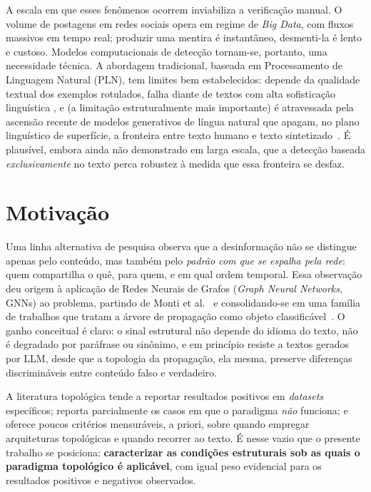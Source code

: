 A escala em que esses fen\^omenos ocorrem inviabiliza a verifica\c{c}\~ao
manual. O volume de postagens em redes sociais opera em regime de
\emph{Big Data}, com fluxos massivos em tempo real; produzir uma mentira
\'e instant\^aneo, desmenti-la \'e lento e custoso. Modelos
computacionais de detec\c{c}\~ao tornam-se, portanto, uma necessidade t\'ecnica. A abordagem tradicional, baseada
em Processamento de Linguagem Natural (PLN), tem limites bem
estabelecidos: depende da qualidade textual dos exemplos rotulados,
falha diante de textos com alta sofistica\c{c}\~ao lingu\'istica
\cite{pmc_overviewfakenews, mdpi_cnn_llm_nlp}, e (a limita\c{c}\~ao
estruturalmente mais importante) \'e atravessada pela ascens\~ao
recente de modelos generativos de l\'ingua natural que apagam, no
plano lingu\'istico de superf\'icie, a fronteira entre texto humano e
texto sintetizado~\cite{arxiv_llmfakenews}. \'E plaus\'ivel, embora
ainda n\~ao demonstrado em larga escala, que a detec\c{c}\~ao baseada
\emph{exclusivamente} no texto perca robustez \`a medida que essa
fronteira se desfaz.

\section{Motiva\c{c}\~ao}
\label{sec:motivacao}

Uma linha alternativa de pesquisa observa que a desinforma\c{c}\~ao
n\~ao se distingue apenas pelo conte\'udo, mas tamb\'em pelo
\emph{padr\~ao com que se espalha pela rede}: quem compartilha o qu\^e,
para quem, e em qual ordem temporal. Essa observa\c{c}\~ao deu origem
\`a aplica\c{c}\~ao de Redes Neurais de Grafos (\emph{Graph Neural
Networks}, GNNs) ao problema, partindo de Monti et
al.~\cite{monti2019fakenews} e consolidando-se em uma fam\'ilia de
trabalhos que tratam a \'arvore de propaga\c{c}\~ao como objeto
classific\'avel~\cite{dou2021upfd, bian2020bigcn, mdpi_bidirectionalgcn,
pmc_gnnsurveyfakenews}. O ganho conceitual \'e claro: o sinal estrutural
n\~ao depende do idioma do texto, n\~ao \'e degradado por par\'afrase ou
sin\^onimo, e em princ\'ipio resiste a textos gerados por LLM,
desde que a topologia da propaga\c{c}\~ao, ela mesma, preserve
diferen\c{c}as discrimin\'aveis entre conte\'udo falso e verdadeiro.

A literatura topol\'ogica tende a reportar
resultados positivos em \emph{datasets} espec\'ificos; reporta
parcialmente os casos em que o paradigma \emph{n\~ao} funciona; e
oferece poucos crit\'erios mensur\'aveis, a priori, sobre quando
empregar arquiteturas topol\'ogicas e quando recorrer ao texto. \'E
nesse vazio que o presente trabalho se posiciona: \textbf{caracterizar
as condi\c{c}\~oes estruturais sob as quais o paradigma topol\'ogico
\'e aplic\'avel}, com igual peso evidencial para os resultados
positivos e negativos observados.


